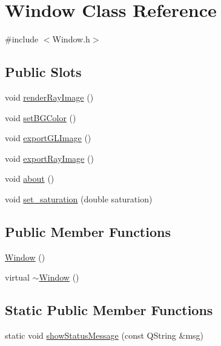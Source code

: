 \hypertarget{class_window}{
\section{Window Class Reference}
\label{class_window}
}


{\ttfamily \#include $<$Window.h$>$}

\subsection*{Public Slots}
\begin{DoxyCompactItemize}
\item 
void \hyperlink{class_window_a324ff57fb0133df279d95f42b6fba94f}{renderRayImage} ()
\item 
void \hyperlink{class_window_accf48a27fa734a601de2193502b5db51}{setBGColor} ()
\item 
void \hyperlink{class_window_a486276a193d634bc33ea2e0b105b72b6}{exportGLImage} ()
\item 
void \hyperlink{class_window_a1ff6807e4c77f8a943ad4dd6bf5c953f}{exportRayImage} ()
\item 
void \hyperlink{class_window_a0c39da3e21969b8862f73fd30dd2009c}{about} ()
\item 
void \hyperlink{class_window_aefdec1faa3a4e36bc62be3ea48867bbd}{set\_\-saturation} (double saturation)
\end{DoxyCompactItemize}
\subsection*{Public Member Functions}
\begin{DoxyCompactItemize}
\item 
\hyperlink{class_window_a74e6087da23d3c24e9fac0245e5ec92c}{Window} ()
\item 
virtual \hyperlink{class_window_a245d821e6016fa1f6970ccbbedd635f6}{$\sim$Window} ()
\end{DoxyCompactItemize}
\subsection*{Static Public Member Functions}
\begin{DoxyCompactItemize}
\item 
static void \hyperlink{class_window_a073d51b06af057dd881a7dbe452d3842}{showStatusMessage} (const QString \&msg)
\end{DoxyCompactItemize}


